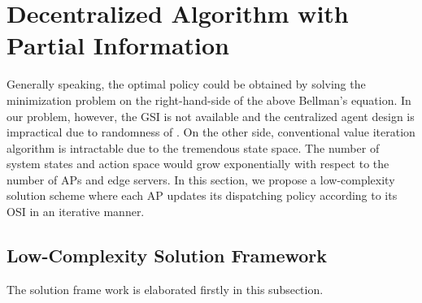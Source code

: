 \section{Decentralized Algorithm with Partial Information}
Generally speaking, the optimal policy could be obtained by solving the minimization problem on the right-hand-side of the above Bellman's equation. %
In our problem, however, the GSI is not available and the centralized agent design is impractical due to randomness of \brlatency.
On the other side, conventional value iteration algorithm is intractable due to the tremendous state space.
The number of system states and action space would grow exponentially with respect to the number of APs and edge servers.
In this section, we propose a low-complexity solution scheme where each AP updates its dispatching policy according to its OSI in an iterative manner.

\subsection{Low-Complexity Solution Framework}
The solution frame work is elaborated firstly in this subsection.


